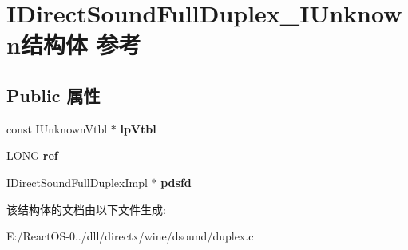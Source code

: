 \hypertarget{struct_i_direct_sound_full_duplex___i_unknown}{}\section{I\+Direct\+Sound\+Full\+Duplex\+\_\+\+I\+Unknown结构体 参考}
\label{struct_i_direct_sound_full_duplex___i_unknown}
\subsection*{Public 属性}
\begin{DoxyCompactItemize}
\item 
\mbox{\label{struct_i_direct_sound_full_duplex___i_unknown_a0212fcb8da814df33c0da44a83c4a22b}} 
const I\+Unknown\+Vtbl $\ast$ {\bfseries lp\+Vtbl}
\item 
\mbox{\label{struct_i_direct_sound_full_duplex___i_unknown_adc23da333a8316aad26a21c60c1054fd}} 
L\+O\+NG {\bfseries ref}
\item 
\mbox{\label{struct_i_direct_sound_full_duplex___i_unknown_a6db9b6e09f1739874295c7225af0c550}} 
\hyperlink{struct_i_direct_sound_full_duplex_impl}{I\+Direct\+Sound\+Full\+Duplex\+Impl} $\ast$ {\bfseries pdsfd}
\end{DoxyCompactItemize}


该结构体的文档由以下文件生成\+:\begin{DoxyCompactItemize}
\item 
E\+:/\+React\+O\+S-\/0../dll/directx/wine/dsound/duplex.\+c\end{DoxyCompactItemize}
